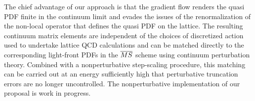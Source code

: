 The chief advantage of our approach is that the gradient flow renders the quasi 
PDF finite in the continuum limit and evades the issues of the renormalization 
of 
the non-local operator that defines 
the quasi PDF on the lattice. The resulting continuum matrix elements are 
independent of the choices of discretized action used to undertake 
lattice QCD calculations and can be 
matched directly to the corresponding light-front PDFs in the $\overline{MS}$ scheme 
using 
continuum perturbation theory. Combined with a 
nonperturbative step-scaling procedure, this matching can be carried out at an 
energy sufficiently high that perturbative truncation errors are no longer 
uncontrolled. The nonperturbative implementation of our proposal is work in 
progress.
